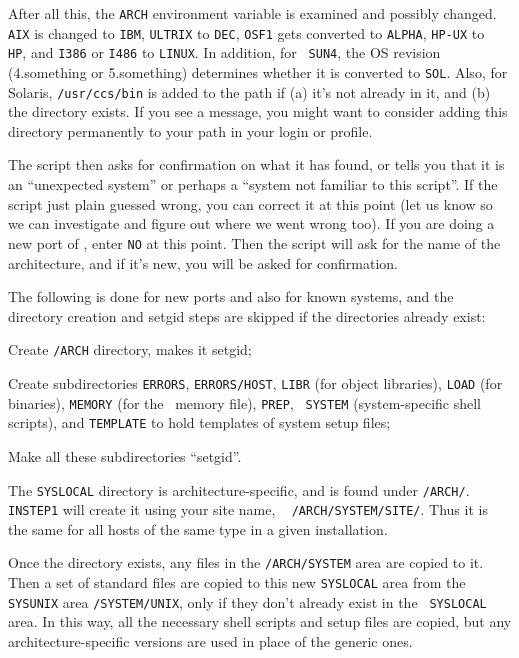 After all this, the {\tt ARCH} environment variable is examined and
possibly changed.  {\tt AIX} is changed to {\tt IBM}, {\tt ULTRIX} to
{\tt DEC}, {\tt OSF1} gets converted to {\tt ALPHA}, {\tt HP-UX} to {\tt
HP}, and {\tt I386} or {\tt I486} to {\tt LINUX}.  In addition, for {\tt
SUN4}, the OS revision (4.something or 5.something) determines whether
it is converted to {\tt SOL}.  Also, for Solaris, {\tt /usr/ccs/bin} is
added to the path if (a) it's not already in it, and (b) the directory
exists.  If you see a message, you might want to consider adding this
directory permanently to your path in your login or profile.

The script then asks for confirmation on what it has found, or tells you
that it is an ``unexpected system'' or perhaps a ``system not familiar
to this script''.  If the script just plain guessed wrong, you can
correct it at this point (let us know so we can investigate and figure
out where we went wrong too).  If you are doing a new port of \AIPS,
enter {\tt NO} at this point.  Then the script will ask for the name of
the architecture, and if it's new, you will be asked for confirmation.

The following is done for new ports and also for known systems, and the
directory creation and setgid steps are skipped if the directories
already exist:
\medskip

\item\bul Create {\tt\thisver/\dol ARCH} directory, makes it setgid;
\item\bul Create subdirectories {\tt ERRORS}, {\tt ERRORS/\dol HOST},
        {\tt LIBR} (for object libraries), {\tt LOAD} (for binaries),
        {\tt MEMORY} (for the \AIPS\ memory file), {\tt PREP}, {\tt
        SYSTEM} (system-specific shell scripts), and {\tt TEMPLATE} to
        hold templates of system setup files;
\item\bul Make all these subdirectories ``setgid''.


The {\tt\dol SYSLOCAL} directory is architecture-specific, and is found
under {\tt\thisver/\dol ARCH/}.  {\tt INSTEP1} will create it using your
site name, \ie~ {\tt\thisver/\dol ARCH/SYSTEM/\dol SITE/}.  Thus it is the
same for all hosts of the same type in a given installation.

Once the directory exists, any files in the {\tt\thisver/\dol ARCH/SYSTEM}
area are copied to it.  Then a set of standard files are copied to this
new {\tt \dol SYSLOCAL} area from the {\tt \dol SYSUNIX} area
{\tt\thisver/SYSTEM/UNIX}, only if they don't already exist in the {\tt
\dol SYSLOCAL} area.  In this way, all the necessary shell scripts and
setup files are copied, but any architecture-specific versions are used in
place of the generic ones.

